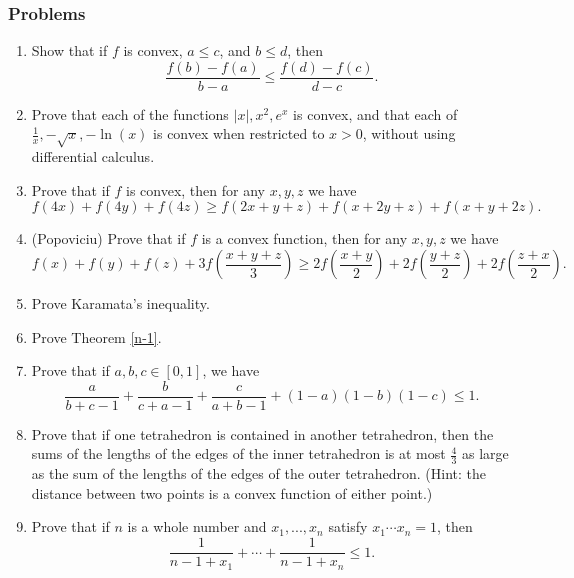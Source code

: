 \subsubsection{Problems}
\begin{enumerate}
\item Show that if $f$ is convex, $a\le c$, and $b\le d$, then
\[
\frac{f(b)-f(a)}{b-a} \le \frac{f(d)-f(c)}{d-c}.
\]

\item Prove that each of the functions $|x|, x^2, e^x$ is convex, and that each of $\frac{1}{x}, -\sqrt{x}, -\ln(x)$ is convex when restricted to $x>0$, without using differential calculus.

\item Prove that if $f$ is convex, then for any $x,y,z$ we have
\[
f(4x) + f(4y) + f(4z) \ge f(2x+y+z) + f(x+2y+z) + f(x+y+2z).
\]

\item (Popoviciu) Prove that if $f$ is a convex function, then for any $x,y,z$ we have
\[
f(x) + f(y) + f(z) + 3f\left(\frac{x+y+z}{3}\right) \ge 2f\left(\frac{x+y}{2}\right) + 2f\left(\frac{y+z}{2}\right) + 2f\left(\frac{z+x}{2}\right).
\]

\item Prove Karamata's inequality.

\item Prove Theorem \ref{n-1}.

\item Prove that if $a,b,c \in [0,1]$, we have
\[
\frac{a}{b+c-1}+\frac{b}{c+a-1}+\frac{c}{a+b-1}+(1-a)(1-b)(1-c) \le 1.
\]

\item Prove that if one tetrahedron is contained in another tetrahedron, then the sums of the lengths of the edges of the inner tetrahedron is at most $\frac{4}{3}$ as large as the sum of the lengths of the edges of the outer tetrahedron. (Hint: the distance between two points is a convex function of either point.)

\item Prove that if $n$ is a whole number and $x_1, ..., x_n$ satisfy $x_1\cdots x_n = 1$, then
\[
\frac{1}{n-1+x_1} + \cdots + \frac{1}{n-1+x_n} \le 1.
\]

\begin{comment}
\item Prove that if $f$ is differentiable and $f'$ is convex, then we have
\begin{align*}
f(3)+3f(1) \ge&\ 3f(2) + f(0)\mbox{, and}\\
f(6)+f(2)+f(1) \ge&\ f(5) + f(4) + f(0).
\end{align*}


\end{comment}
\end{enumerate}
